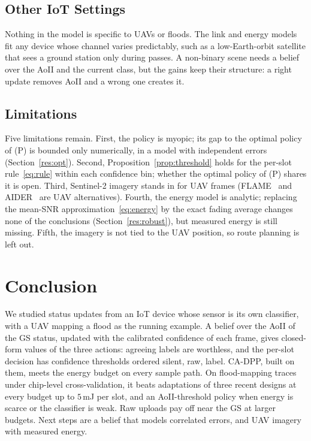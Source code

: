 \documentclass[5p,twocolumn]{elsarticle}
\theoremstyle{remark}
\begin{document}
\subsection{Other IoT Settings}
Nothing in the model is specific to UAVs or floods. The link and energy models fit any device whose channel varies predictably, such as a low-Earth-orbit satellite that sees a ground station only during passes. A non-binary scene needs a belief over the AoII and the current class, but the gains keep their structure: a right update removes AoII and a wrong one creates it.

\subsection{Limitations}
Five limitations remain. First, the policy is myopic; its gap to the optimal policy of (P) is bounded only numerically, in a model with independent errors (Section~\ref{res:opt}). Second, Proposition~\ref{prop:threshold} holds for the per-slot rule~\eqref{eq:rule} within each confidence bin; whether the optimal policy of (P) shares it is open. Third, Sentinel-2 imagery stands in for UAV frames (FLAME~\cite{shamsoshoara2021flame} and AIDER~\cite{kyrkou2020aider} are UAV alternatives). Fourth, the energy model is analytic; replacing the mean-SNR approximation~\eqref{eq:energy} by the exact fading average changes none of the conclusions (Section~\ref{res:robust}), but measured energy is still missing. Fifth, the imagery is not tied to the UAV position, so route planning is left out.

\section{Conclusion}\label{sec:concl}
We studied status updates from an IoT device whose sensor is its own classifier, with a UAV mapping a flood as the running example. A belief over the AoII of the GS status, updated with the calibrated confidence of each frame, gives closed-form values of the three actions: agreeing labels are worthless, and the per-slot decision has confidence thresholds ordered silent, raw, label. CA-DPP, built on them, meets the energy budget on every sample path. On flood-mapping traces under chip-level cross-validation, it beats adaptations of three recent designs at every budget up to $5$\,mJ per slot, and an AoII-threshold policy when energy is scarce or the classifier is weak. Raw uploads pay off near the GS at larger budgets. Next steps are a belief that models correlated errors, and UAV imagery with measured energy.
\end{document}

